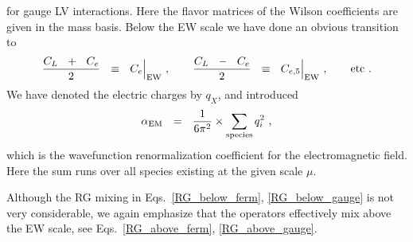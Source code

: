 \documentclass[12pt,preprintnumbers,nofootinbib]{revtex4}
\newcommand{\el}{{\rm EM}}
\begin{document}
	for gauge LV interactions.
	Here the flavor matrices of the Wilson coefficients are given in the mass basis.
	Below the EW scale we have done an obvious transition to
\[
	\frac{ C_L ~~+~~ C_e }{2} ~~\equiv~~ C_e \Bigr|_{\rm EW}~,
	\qquad
	\frac{ C_L ~~-~~ C_e }{2} ~~\equiv~~ C_{e,5} \Bigr|_{\rm EW}~,
	\qquad
	{\rm etc~.}
\]
	We have denoted the electric charges by $ q_X $, and introduced
\[
	\alpha_\el ~~=~~ \frac{1}{6\pi^2} \times \sum_{\text{species}} q_i^2~,
\]
	which is the wavefunction renormalization coefficient for the electromagnetic field.
	Here the sum runs over all species existing at the given scale $ \mu $.

	Although the RG mixing in Eqs.~\eqref{RG_below_ferm}, \eqref{RG_below_gauge} is not very 
	considerable, we again emphasize that the operators effectively mix above the EW scale, 
	see Eqs.~\eqref{RG_above_ferm}, \eqref{RG_above_gauge}.
		
\end{document}
